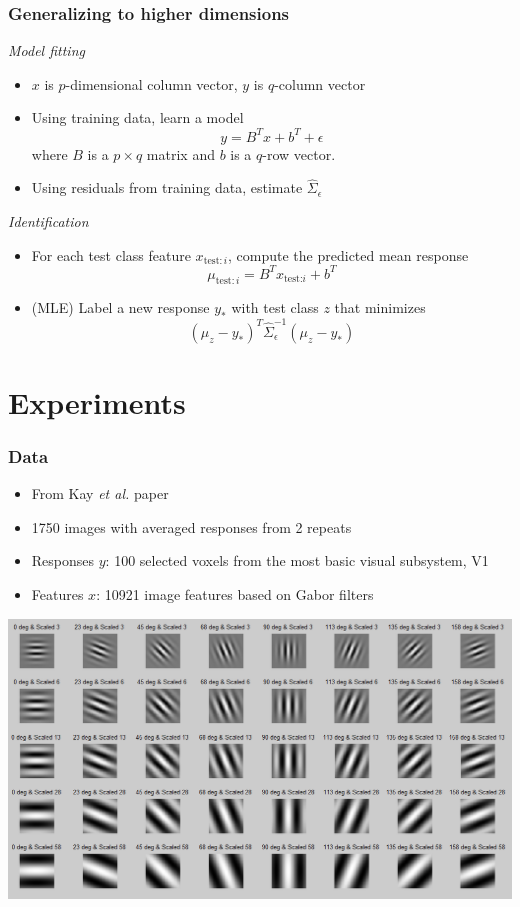 \documentclass{beamer}
\begin{document}
\begin{frame}
\frametitle{Generalizing to higher dimensions}
\emph{Model fitting}
\begin{itemize}
\item $x$ is $p$-dimensional column vector, $y$ is $q$-column vector
\item Using training data, learn a model
\[
y = B^T x + b^T + \epsilon
\]
where $B$ is a $p \times q$ matrix and $b$ is a $q$-row vector.
\item Using residuals from training data, estimate $\hat{\Sigma}_\epsilon$
\end{itemize}
\emph{Identification}
\begin{itemize}
\item For each test class feature $x_{\text{test}: i}$, compute the
  predicted mean response
\[
\mu_{\text{test}: i} = B^T x_{\text{test:} i} + b^T
\]
\item (MLE) Label a new response $y_*$ with test class $z$ that minimizes
\[
(\mu_z - y_*)^T \hat{\Sigma}_\epsilon^{-1} (\mu_z - y_*)
\]
\end{itemize}
\end{frame}

\section{Experiments}
\frame{\sectionpage}

\begin{frame}
\frametitle{Data}
\begin{itemize}
\item From Kay \emph{et al.} paper
\item 1750 images with averaged responses from 2 repeats
\item Responses $y$: 100 selected voxels from the most basic visual subsystem, V1
\item Features $x$: 10921 image features based on Gabor filters
\end{itemize}
\begin{center}
\includegraphics[scale = 0.3]{gabor.png}
\end{center}
\end{frame}
\end{document}
